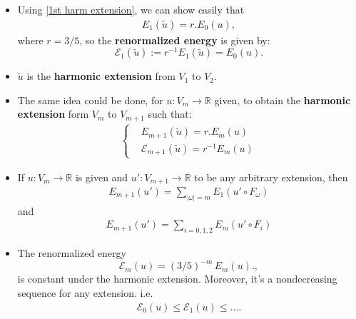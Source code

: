 \begin{frame}
\begin{itemize}
    \item Using \eqref{1st harm extension}, we can show easily that 
    \begin{align}
        E_1(\tilde{u})=r.E_0(u),
    \end{align}
    where $r=3/5$, so the \textbf{renormalized energy} is given by:
    $$
    \mathcal{E}_{1}(\tilde{u}):=r^{-1}E_1(\tilde{u})=E_0(u).
    $$
\item $\tilde{u}$ is the \textbf{harmonic extension} from $V_1$ to $V_2$.

\item The same idea could be done, for $u:V_m\rightarrow \mathbb{R}$ given, to obtain the \textbf{harmonic extension} form $V_m$ to $V_{m+1}$ such that:
\begin{align}
    \left\{ \begin{array}{cc}
        &E_{m+1}(\tilde{u})=r.E_{m}(u)   \\
        &\mathcal{E}_{m+1}(\tilde{u})=r^{-1}E_{m}(u) 
    \end{array}\right.
\end{align}
\end{itemize}    
\end{frame}
\begin{frame}
    \begin{itemize}
        \item If $u:V_m\rightarrow \mathbb{R}$ is given and $u':V_{m+1}\rightarrow \mathbb{R}$ to be any arbitrary extension, then 
        \begin{align}
        E_{m+1}(u')=\underset{|\omega|=m}{\sum}E_1(u'\circ F_{\omega})    
        \end{align}
        and 
        \begin{align}
        E_{m+1}(u')=\underset{i=0,1,2}{\sum}E_m(u'\circ F_{i})    
        \end{align}
        
        \item The renormalized energy 
        $$
        \mathcal{E}_{m}(u)=(3/5)^{-m}\,E_{m}(u).,
        $$
        is constant under the harmonic extension. Moreover, it's a nondecreasing sequence for any extension. i.e.
        \begin{align}
            \mathcal{E}_{0}(u)\leq \mathcal{E}_{1}(u)\leq \ldots.
        \end{align}
    \end{itemize}
\end{frame}
